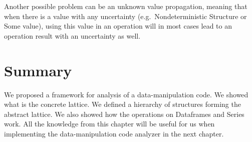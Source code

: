 Another possible problem can be an unknown value propagation, meaning that when there is a value with any uncertainty
(e.g.\ Nondeterministic Structure or Some value), using this value in an operation will in most cases lead to an
operation result with an uncertainty as well.

\section*{Summary}

We proposed a framework for analysis of a data-manipulation code.
We showed what is the concrete lattice.
We defined a hierarchy of structures forming the abstract lattice.
We also showed how the operations on Dataframes and Series work.
All the knowledge from this chapter will be useful for us when implementing the data-manipulation code analyzer
in the next chapter.

